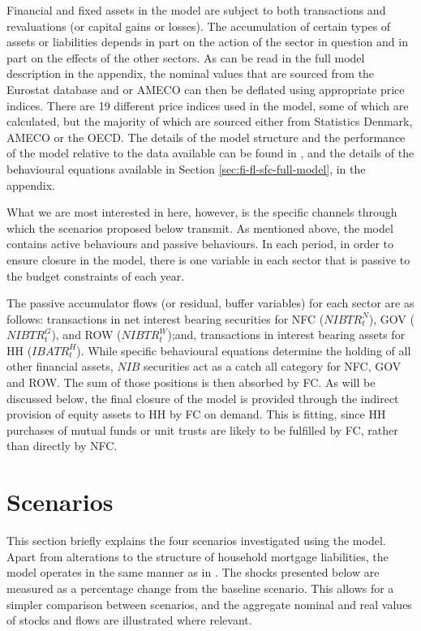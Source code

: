 \documentclass[
]{book}
\begin{document}
Financial and fixed assets in the model are subject to both transactions and revaluations (or capital gains or losses). The accumulation of certain types of assets or liabilities depends in part on the action of the sector in question and in part on the effects of the other sectors. As can be read in the full model description in the appendix, the nominal values that are sourced from the Eurostat database and or AMECO can then be deflated using appropriate price indices. There are 19 different price indices used in the model, some of which are calculated, but the majority of which are sourced either from Statistics Denmark, AMECO or the OECD. The details of the model structure and the performance of the model relative to the data available can be found in \citet{byrialsenraza2019empirical}, and the details of the behavioural equations available in Section \ref{sec:fi-fl-sfc-full-model}, in the appendix.

What we are most interested in here, however, is the specific channels through which the scenarios proposed below transmit. As mentioned above, the model contains active behaviours and passive behaviours. In each period, in order to ensure closure in the model, there is one variable in each sector that is passive to the budget constraints of each year.

The passive accumulator flows (or residual, buffer variables) for each sector are as follows:
transactions in net interest bearing securities for NFC (\(NIBTR^N_t\)), GOV (\(NIBTR^G_t\)), and ROW (\(NIBTR^W_t\));and, transactions in interest bearing assets for HH (\(IBATR^H_t\)).
While specific behavioural equations determine the holding of all other financial assets, \(NIB\) securities act as a catch all category for NFC, GOV and ROW. The sum of those positions is then absorbed by FC. As will be discussed below, the final closure of the model is provided through the indirect provision of equity assets to HH by FC on demand. This is fitting, since HH purchases of mutual funds or unit trusts are likely to be fulfilled by FC, rather than directly by NFC.

\hypertarget{sec:fi-fl-sfc-scenarios}{%
\section{Scenarios}\label{sec:fi-fl-sfc-scenarios}}

This section briefly explains the four scenarios investigated using the model. Apart from alterations to the structure of household mortgage liabilities, the model operates in the same manner as in \citet{byrialsenraza2019empirical}. The shocks presented below are measured as a percentage change from the baseline scenario.
This allows for a simpler comparison between scenarios, and the aggregate nominal
and real values of stocks and flows are illustrated where relevant.
\end{document}
